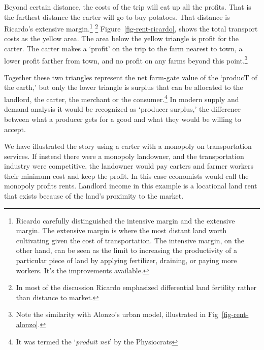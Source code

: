 Beyond certain distance, the costs of the trip will eat up all the profits. That is the farthest distance the carter will go to buy potatoes. That distance is Ricardo's \gls{extensive margin}.\footnote{Ricardo carefully distinguished the \gls{intensive margin} and the \gls{extensive margin}. The extensive margin is where the most distant land worth cultivating given the cost of transportation. The intensive margin, on the other hand, can be seen as the limit to increasing the productivity  of a particular piece of land by applying fertilizer, draining, or paying more workers. It's the improvements available.}%
\footnote{In most of the discussion Ricardo emphasized  differential land fertility rather than distance to market.}
Figure~\ref{fig-rent-ricardo}, shows the total transport costs as the yellow area. The area below the yellow triangle is profit for the carter. The carter makes a `profit' on the trip to the farm nearest to town, a lower profit farther from town, and no profit on any farms beyond this point.\footnote{Note the similarity with Alonzo's urban model, illustrated in Fig~\ref{fig-rent-alonzo}.}

Together these two triangles represent the net farm-gate value of the `producT of the earth,' but only the lower triangle is surplus that can be allocated to the landlord, the carter, the merchant or the consumer.\footnote{It was termed the `\textit{produit net}' by the Physiocrats} In modern supply and demand analysis it would be recognized as `producer surplus,' the difference between what a producer gets for a good and what they would be willing to accept.

We have illustrated the story using a carter with a monopoly on transportation services. If instead there were a monopoly landowner, and the transportation industry were competitive, the landowner would pay carters and farmer workers their minimum cost and keep the profit. In this case economists would call the monopoly profits rents. %
Landlord income in this example is a locational \gls{land rent} that exists because of the land's proximity to the market.  

